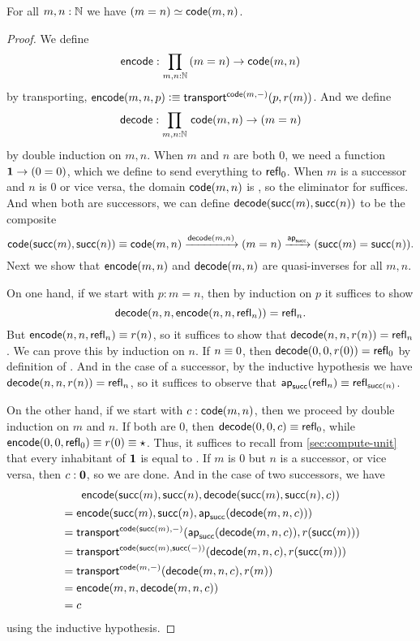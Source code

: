 \begin{thm}\label{thm:path-nat}
  For all $m,n:\mathbb{N}$ we have $(m=n) \simeq \mathsf{code}(m,n)$.
\end{thm}
\begin{proof}
  We define
  \[ \encode : \prd{m,n:\N} (m=n) \to \code(m,n) \]
  by transporting, $\mathsf{encode}(m,n,p) \vcentcolon\equiv \mathsf{transport}^{\mathsf{code}(m,-)}(p,r(m))$.
  And we define
  \[ \decode : \prd{m,n:\N} \code(m,n) \to (m=n) \]
  by double induction on $m,n$.
  When $m$ and $n$ are both $0$, we need a function $\mathbf{1} \to (0=0)$, which we define to send everything to $\mathsf{refl}_{0}$.
  When $m$ is a successor and $n$ is $0$ or vice versa, the domain $\mathsf{code}(m,n)$ is \emptyt, so the eliminator for \emptyt suffices.
  And when both are successors, we can define $\mathsf{decode}(\mathsf{succ}(m),\mathsf{succ}(n))$ to be the composite
  \[ \mathsf{code}(\mathsf{succ}(m),\mathsf{succ}(n))\equiv\mathsf{code}(m,n) \xrightarrow{\mathsf{decode}(m,n)} (m=n) \xrightarrow{\mathsf{ap}_{\mathsf{succ}}} (\mathsf{succ}(m)=\mathsf{succ}(n)). \]
  Next we show that $\mathsf{encode}(m,n)$ and $\mathsf{decode}(m,n)$ are quasi-inverses for all $m,n$.

  On one hand, if we start with $p:m=n$, then by induction on $p$ it suffices to show
  \[\mathsf{decode}(n,n,\mathsf{encode}(n,n,\mathsf{refl}_{n}))=\mathsf{refl}_{n}.\]
  But $\mathsf{encode}(n,n,\mathsf{refl}_{n}) \equiv r(n)$, so it suffices to show that $\mathsf{decode}(n,n,r(n)) =\mathsf{refl}_{n}$.
  We can prove this by induction on $n$.
  If $n\equiv 0$, then $\mathsf{decode}(0,0,r(0)) =\mathsf{refl}_{0}$ by definition of \decode.
  And in the case of a successor, by the inductive hypothesis we have $\mathsf{decode}(n,n,r(n)) = \mathsf{refl}_{n}$, so it suffices to observe that $\mathsf{ap}_{\mathsf{succ}}(\mathsf{refl}_{n}) \equiv \mathsf{refl}_{\mathsf{succ}(n)}$.

  On the other hand, if we start with $c:\mathsf{code}(m,n)$, then we proceed by double induction on $m$ and $n$.
  If both are $0$, then $\mathsf{decode}(0,0,c) \equiv \mathsf{refl}_{0}$, while $\mathsf{encode}(0,0,\mathsf{refl}_{0})\equiv r(0) \equiv \star$.
  Thus, it suffices to recall from \autoref{sec:compute-unit} that every inhabitant of $\mathbf{1}$ is equal to \ttt.
  If $m$ is $0$ but $n$ is a successor, or vice versa, then $c:\mathbf{0}$, so we are done.
  And in the case of two successors, we have
  \begin{multline*}
    \mathsf{encode}(\mathsf{succ}(m),\mathsf{succ}(n),\mathsf{decode}(\mathsf{succ}(m),\mathsf{succ}(n),c))\\
    \begin{split}
    &= \mathsf{encode}(\mathsf{succ}(m),\mathsf{succ}(n),\mathsf{ap}_{\mathsf{succ}}(\mathsf{decode}(m,n,c)))\\
    &= \mathsf{transport}^{\mathsf{code}(\mathsf{succ}(m),-)}(\mathsf{ap}_{\mathsf{succ}}(\mathsf{decode}(m,n,c)),r(\mathsf{succ}(m)))\\
    &= \mathsf{transport}^{\mathsf{code}(\mathsf{succ}(m),\mathsf{succ}(-))}(\mathsf{decode}(m,n,c),r(\mathsf{succ}(m)))\\
    &= \mathsf{transport}^{\mathsf{code}(m,-)}(\mathsf{decode}(m,n,c),r(m))\\
    &= \mathsf{encode}(m,n,\mathsf{decode}(m,n,c))\\
    &= c
  \end{split}
  \end{multline*}
  using the inductive hypothesis.
\end{proof}

